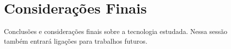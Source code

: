 \section{Considerações Finais}\label{sec:con}
Conclusões e considerações finais sobre a tecnologia estudada. Nessa sessão também entrará ligações para trabalhos futuros.